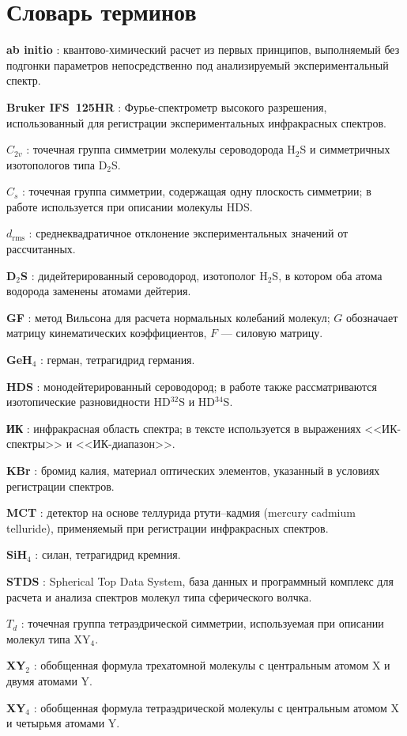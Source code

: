 \chapter*{Словарь терминов}             %

{\bfseries\boldmath ab initio} : квантово-химический расчет из первых принципов, выполняемый без подгонки параметров непосредственно под анализируемый экспериментальный спектр.

{\bfseries\boldmath Bruker IFS~125HR} : Фурье-спектрометр высокого разрешения, использованный для регистрации экспериментальных инфракрасных спектров.

{\bfseries\boldmath \(C_{2v}\)} : точечная группа симметрии молекулы сероводорода H$_2$S и симметричных изотопологов типа D$_2$S.

{\bfseries\boldmath \(C_s\)} : точечная группа симметрии, содержащая одну плоскость симметрии; в работе используется при описании молекулы HDS.

{\bfseries\boldmath \(d_{\mathrm{rms}}\)} : среднеквадратичное отклонение экспериментальных значений от рассчитанных.

{\bfseries\boldmath D$_2$S} : дидейтерированный сероводород, изотополог H$_2$S, в котором оба атома водорода заменены атомами дейтерия.

{\bfseries\boldmath GF} : метод Вильсона для расчета нормальных колебаний молекул; $G$ обозначает матрицу кинематических коэффициентов, $F$ --- силовую матрицу.

{\bfseries\boldmath GeH$_4$} : герман, тетрагидрид германия.

{\bfseries\boldmath HDS} : монодейтерированный сероводород; в работе также рассматриваются изотопические разновидности HD$^{32}$S и HD$^{34}$S.

{\bfseries\boldmath ИК} : инфракрасная область спектра; в тексте используется в выражениях <<ИК-спектры>> и <<ИК-диапазон>>.

{\bfseries\boldmath KBr} : бромид калия, материал оптических элементов, указанный в условиях регистрации спектров.

{\bfseries\boldmath MCT} : детектор на основе теллурида ртути--кадмия (mercury cadmium telluride), применяемый при регистрации инфракрасных спектров.

{\bfseries\boldmath SiH$_4$} : силан, тетрагидрид кремния.

{\bfseries\boldmath STDS} : Spherical Top Data System, база данных и программный комплекс для расчета и анализа спектров молекул типа сферического волчка.

{\bfseries\boldmath \(T_d\)} : точечная группа тетраэдрической симметрии, используемая при описании молекул типа XY$_4$.

{\bfseries\boldmath XY$_2$} : обобщенная формула трехатомной молекулы с центральным атомом X и двумя атомами Y.

{\bfseries\boldmath XY$_4$} : обобщенная формула тетраэдрической молекулы с центральным атомом X и четырьмя атомами Y.
